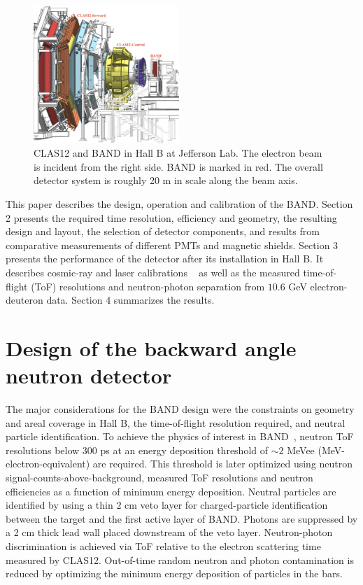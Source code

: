 \documentclass[3p,twocolumn]{elsarticle}
\begin{document}
\begin{figure}[t!]
	\centering
	\includegraphics[width=0.49\textwidth]{BandInClas.jpg}
        \caption{CLAS12 and BAND in Hall B at Jefferson Lab. The
          electron beam is incident from the right side. BAND is
          marked in red. The overall detector system is roughly 20
          \si{\meter} in scale along the beam axis. }
		\label{fig:clas12band}
\end{figure}
This paper describes the design, operation and calibration of the BAND.
Section 2 presents the required time resolution, efficiency and
geometry, the resulting design and layout, the selection of detector
components, and results from comparative measurements of different
PMTs and magnetic shields. Section 3 presents the performance of the
detector after its installation in Hall B. It describes cosmic-ray and
laser calibrations ~\cite{band-laser} as well as the measured
time-of-flight (ToF) resolutions and neutron-photon separation from
$10.6$ \si{\GeV} electron-deuteron data. Section 4 summarizes the
results.




\section{Design of the backward angle neutron detector}
The major considerations for the BAND design were the constraints on
geometry and areal coverage in Hall B, the time-of-flight resolution
required, and neutral particle identification.  To achieve the physics
of interest in BAND~\cite{band-proposal}, neutron ToF
resolutions below $300$ \si{\pico\second} at an energy deposition
threshold of $\sim 2$ MeVee (MeV-electron-equivalent) are required. 
This threshold is later optimized using neutron signal-counts-above-background,
measured ToF resolutions and neutron efficiencies as a function of minimum energy deposition.
Neutral particles are
identified by using a thin $2$ \si{\centi\meter} veto layer for
charged-particle identification between the target and the first
active layer of BAND. Photons are suppressed by a 2 \si{\centi\meter}
thick lead wall placed downstream of the veto layer. Neutron-photon
discrimination is achieved via ToF relative to the electron scattering
time measured by CLAS12. Out-of-time random neutron and photon
contamination is reduced by optimizing the minimum energy deposition of particles in the bars.
\end{document}
